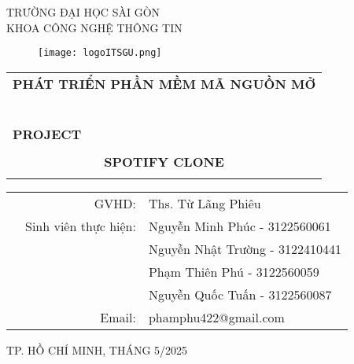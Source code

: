 \documentclass{book}
\begin{document}
\let\cleardoublepage\clearpage
\begin{titlepage}
\begin{center}
TRƯỜNG ĐẠI HỌC SÀI GÒN \\
KHOA CÔNG NGHỆ THÔNG TIN
\end{center}
\vspace{1cm}

\begin{figure}[h!]
\begin{center}
\texttt{[image: logoITSGU.png]}
\end{center}
\end{figure}

\vspace{1cm}


\begin{center}
\begin{tabular}{c}
	\multicolumn{1}{l}{\textbf{{\Large PHÁT TRIỂN PHẦN MỀM MÃ NGUỒN MỞ}}}\\
	~~\\
	\hline
	\\
	\multicolumn{1}{l}{\textbf{{\Large PROJECT }}}\\
	\\
	
	\textbf{{\Huge SPOTIFY CLONE}}\\
	\\
	\hline
\end{tabular}
\end{center}

\vspace{2cm}

\begin{table}[h]
\begin{tabular}{rrl}
\hspace{3 cm} & GVHD: & Ths. Từ Lãng Phiêu\\
& Sinh viên thực hiện: & Nguyễn Minh Phúc - 3122560061\\
& & Nguyễn Nhật Trường - 3122410441 \\
& & Phạm Thiên Phú - 3122560059 \\
& & Nguyễn Quốc Tuấn - 3122560087 \\

& Email: & phamphu422@gmail.com \\
\end{tabular}
\vspace{1.5 cm}
\end{table}

\begin{center}

{\footnotesize TP. HỒ CHÍ MINH, THÁNG 5/2025}
\end{center}
\end{titlepage}
\end{document}
